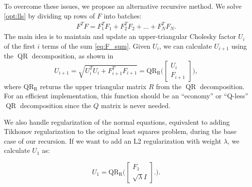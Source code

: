 \documentclass[../root.tex]{subfiles}
\begin{document}
To overcome these issues, we propose an alternative recursive method. We solve
\eqref{opt:lls} by dividing up rows of $F$ into batches:
\begin{align} \label{eq:F_sum}
  F^T F = F_1^T F_1 + F_2^T F_2 + \ldots + F_N^T F_N.
\end{align}
The main idea is to maintain and update an upper-triangular Cholesky factor $U_i$ of the
first $i$ terms of the sum \eqref{eq:F_sum}. Given $U_i$, we can calculate $U_{i+1}$ using
the $\operatorname{QR}$ decomposition, as shown in \cite{howell_ALTRO_2019}
\begin{equation}
  U_{i+1} = \sqrt{U_i^TU_i + F_{i+1}^TF_{i+1}} = 
  \operatorname{QR_R}\bigg( \begin{bmatrix} {U_i} \\ {F_{i+1}} \end{bmatrix} \bigg),
\end{equation}
where $\operatorname{QR_R}$ returns the upper triangular matrix $R$ from the 
$\operatorname{QR}$ decomposition. For an efficient implementation, this function should be
an ``economy'' or ``Q-less'' $\operatorname{QR}$ decomposition 
since the $Q$ matrix is never needed.

We also handle regularization of the normal equations, equivalent to adding Tikhonov
regularization to the original least squares problem, during the base
case of our recursion. If we want to add an L2 regularization with weight $\lambda$, we
calculate $U_1$ as:

\begin{equation}
  U_1 =  \operatorname{QR_R}\bigg( 
  \begin{bmatrix} {F_1} \\ \sqrt{\lambda} I \end{bmatrix}.
  \bigg).
\end{equation}

\end{document}
